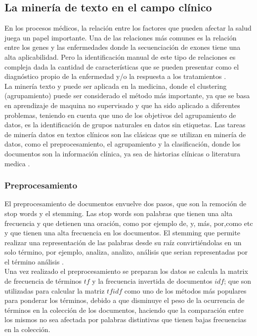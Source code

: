 {\subsection{La minería de texto en el campo clínico}

En los procesos médicos, la relación entre los factores que pueden afectar la salud juega un papel importante. Una de las relaciones más comunes es la relación entre los genes y las enfermedades donde la secuenciación de exones tiene una alta aplicabilidad. Pero la identificación manual de este tipo de relaciones es compleja dada la cantidad de características que se pueden presentar como el diagnóstico propio de la enfermedad y/o la respuesta a los tratamientos \cite{Kawashima2017}.\\

La minería texto y puede ser aplicada en la medicina, donde el clustering (agrupamiento) puede ser considerado el método más importante, ya que se basa en aprendizaje de maquina no supervisado y que ha sido aplicado a diferentes problemas\cite{Kawashima2017}, teniendo en cuenta que uno de los objetivos del agrupamiento de datos, es la  identificación de grupos naturales en datos sin etiquetas. Las tareas de minería datos en textos clínicos son las clásicas que se utilizan en minería de datos, como el preprocesamiento, el agrupamiento y la clasificación, donde los documentos son la información clínica, ya sea de historias clínicas o literatura medica \cite{Jain2010,Renganathan2017}.\\

\subsubsection{Preprocesamiento}

El preprocesamiento de documentos envuelve dos pasos, que son la remoción de stop words y el stemming. Las stop words son palabras que tienen una alta frecuencia y  que detienen una oración, como por ejemplo de, y, más, por,como etc y que tienen una alta frecuencia en los documentos. El stemming  que permite realizar una representación de las palabras desde su raíz convirtiéndolas en un solo término, por ejemplo, analiza, analizo, análisis que serian representadas por el término análisis \cite{Renganathan2017}.\\

Una vez realizado el preprocesamiento se preparan los datos se calcula la matrix de frecuencia de términos $tf$ y la frecuencia invertida de documentos $idf$; que son utilizadas para calcular la matriz $tfidf$ como uno de los métodos más populares para ponderar los términos, debido a que disminuye el peso de la ocurrencia de términos en la colección de los documentos, haciendo que la comparación entre los mismos no sea afectada por palabras distintivas que tienen bajas frecuencias en la colección\cite{Renganathan2017,Allahyari2017}. \\

}
